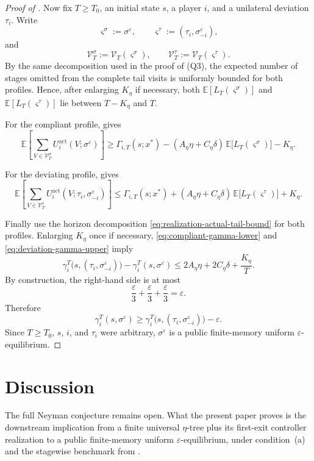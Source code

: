\documentclass[12pt]{article}
\theoremstyle{definition}
\newcommand{\eps}{\varepsilon}
\newcommand{\E}{\mathbb{E}}
\newcommand{\1}{\mathbf{1}}
\begin{document}
\begin{proof}[Proof of ]
Now fix $T\ge T_0$, an initial state $s$, a player $i$, and a unilateral
deviation $\tau_i$. Write
\[
\varsigma^\sigma:=\sigma^\eps,
\qquad
\varsigma^\tau:=(\tau_i,\sigma^\eps_{-i}),
\]
and
\[
\mathcal V_T^\sigma:=\mathcal V_T(\varsigma^\sigma),
\qquad
\mathcal V_T^\tau:=\mathcal V_T(\varsigma^\tau).
\]
By the same decomposition used in the proof of
\textnormal{(Q3)}, the expected number of stages omitted
from the complete tail visits is uniformly bounded for both profiles. Hence,
after enlarging $K_\eta$ if necessary, both
$\E[L_T(\varsigma^\sigma)]$ and $\E[L_T(\varsigma^\tau)]$ lie between
$T-K_\eta$ and $T$.

For the compliant profile,  gives
\begin{equation}
\label{eq:compliant-gamma-lower}
\E\left[
\sum_{V\in\mathcal V_T^\sigma}
U_i^{\mathrm{act}}(V;\sigma^\eps)
\right]
\ge
\Gamma_{i,T}(s;x^*)
-
(A_\eta\eta+C_\eta\delta)\,\E\bigl[L_T(\varsigma^\sigma)\bigr]
-
K_\eta.
\end{equation}

For the deviating profile,  gives
\begin{equation}
\label{eq:deviation-gamma-upper}
\E\left[
\sum_{V\in\mathcal V_T^\tau}
U_i^{\mathrm{act}}(V;\tau_i,\sigma^\eps_{-i})
\right]
\le
\Gamma_{i,T}(s;x^*)
+
(A_\eta\eta+C_\eta\delta)\,\E\bigl[L_T(\varsigma^\tau)\bigr]
+
K_\eta.
\end{equation}

Finally use the horizon decomposition \eqref{eq:realization-actual-tail-bound}
for both profiles. Enlarging $K_\eta$ once if necessary,
\eqref{eq:compliant-gamma-lower} and \eqref{eq:deviation-gamma-upper}
imply
\[
\gamma_i^T\bigl(s,(\tau_i,\sigma^\eps_{-i})\bigr)
-
\gamma_i^T(s,\sigma^\eps)
\le
2A_\eta\eta + 2C_\eta\delta + \frac{K_\eta}{T}.
\]
By construction, the right-hand side is at most
\[
\frac{\eps}{3}+\frac{\eps}{3}+\frac{\eps}{3}=\eps.
\]
Therefore
\[
\gamma_i^T(s,\sigma^\eps)
\ge
\gamma_i^T\bigl(s,(\tau_i,\sigma^\eps_{-i})\bigr)-\eps.
\]
Since $T\ge T_0$, $s$, $i$, and $\tau_i$ were arbitrary, $\sigma^\eps$ is a
public finite-memory uniform $\eps$-equilibrium.
\end{proof}



\section{Discussion}

The full Neyman conjecture remains open. What the present paper proves is the
downstream implication from a finite universal $\eta$-tree plus its first-exit
controller realization to a public finite-memory uniform $\eps$-equilibrium,
under condition~\textnormal{(a)} and the stagewise benchmark from
.
\end{document}
